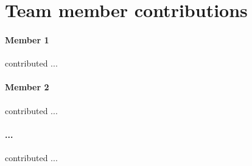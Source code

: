 \documentclass[11pt,a4paper]{article}
\begin{document}
\clearpage
\section{Team member contributions}
\paragraph{Member 1} contributed ...

\paragraph{Member 2} contributed ...

\paragraph{...} contributed ...





\end{document}
